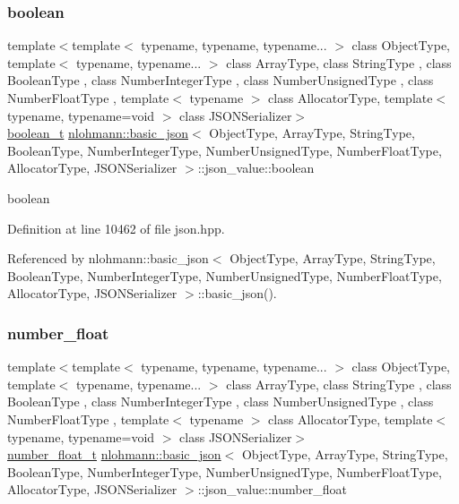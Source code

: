 \subsubsection{\texorpdfstring{boolean}{boolean}}
{\footnotesize\ttfamily template$<$template$<$ typename, typename, typename... $>$ class Object\+Type, template$<$ typename, typename... $>$ class Array\+Type, class String\+Type , class Boolean\+Type , class Number\+Integer\+Type , class Number\+Unsigned\+Type , class Number\+Float\+Type , template$<$ typename $>$ class Allocator\+Type, template$<$ typename, typename=void $>$ class J\+S\+O\+N\+Serializer$>$ \\
\hyperlink{classnlohmann_1_1basic__json_a4c919102a9b4fe0d588af64801436082}{boolean\+\_\+t} \hyperlink{classnlohmann_1_1basic__json}{nlohmann\+::basic\+\_\+json}$<$ Object\+Type, Array\+Type, String\+Type, Boolean\+Type, Number\+Integer\+Type, Number\+Unsigned\+Type, Number\+Float\+Type, Allocator\+Type, J\+S\+O\+N\+Serializer $>$\+::json\+\_\+value\+::boolean}



boolean 



Definition at line 10462 of file json.\+hpp.



Referenced by nlohmann\+::basic\+\_\+json$<$ Object\+Type, Array\+Type, String\+Type, Boolean\+Type, Number\+Integer\+Type, Number\+Unsigned\+Type, Number\+Float\+Type, Allocator\+Type, J\+S\+O\+N\+Serializer $>$\+::basic\+\_\+json().

\mbox{\label{unionnlohmann_1_1basic__json_1_1json__value_ad003495e39e78b8096e0b6fc690d146f}} 
\subsubsection{\texorpdfstring{number\+\_\+float}{number\_float}}
{\footnotesize\ttfamily template$<$template$<$ typename, typename, typename... $>$ class Object\+Type, template$<$ typename, typename... $>$ class Array\+Type, class String\+Type , class Boolean\+Type , class Number\+Integer\+Type , class Number\+Unsigned\+Type , class Number\+Float\+Type , template$<$ typename $>$ class Allocator\+Type, template$<$ typename, typename=void $>$ class J\+S\+O\+N\+Serializer$>$ \\
\hyperlink{classnlohmann_1_1basic__json_a88d6103cb3620410b35200ee8e313d97}{number\+\_\+float\+\_\+t} \hyperlink{classnlohmann_1_1basic__json}{nlohmann\+::basic\+\_\+json}$<$ Object\+Type, Array\+Type, String\+Type, Boolean\+Type, Number\+Integer\+Type, Number\+Unsigned\+Type, Number\+Float\+Type, Allocator\+Type, J\+S\+O\+N\+Serializer $>$\+::json\+\_\+value\+::number\+\_\+float}



